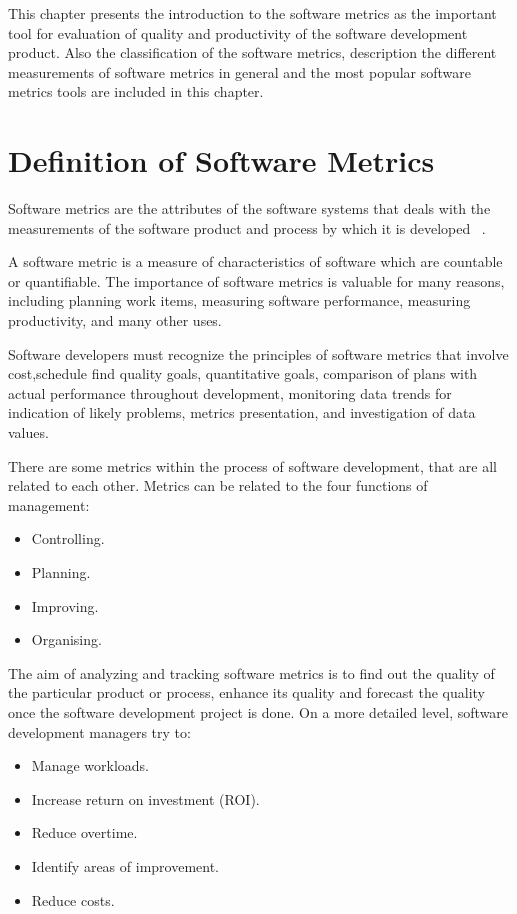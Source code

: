 This chapter presents the introduction to the software metrics as the important tool for evaluation of quality and productivity of the software development product. Also the classification of the software metrics, description the different measurements of software metrics in general and the most popular software metrics tools are included in this chapter.


\section{Definition of Software Metrics}

Software metrics are the attributes of the software systems that deals with the measurements of the software product and process by which it is developed ~\cite{metrix}.
 
A software metric is a measure of characteristics of software which are countable or quantifiable. The importance of software metrics is valuable for many reasons, including planning work items, measuring software performance, measuring productivity, and many other uses.

Software developers must recognize the principles of software metrics that involve cost,schedule find quality goals, quantitative goals, comparison of plans with actual performance throughout development, monitoring data trends for indication of likely problems, metrics presentation, and investigation of data values.

There are some metrics within the process of software development, that are all related to each other. Metrics can be related to the four functions of management:

\begin{itemize}
	\item Controlling.
	\item Planning.
	\item Improving.
	\item Organising.
\end{itemize}

The aim of analyzing and tracking software metrics is to find out the quality of the particular product or process, enhance its quality and forecast the quality once the software development project is done. On a more detailed level, software development managers try to:

\begin{itemize}
	\item Manage workloads.
	\item Increase return on investment (ROI).
	\item Reduce overtime.
	\item Identify areas of improvement.
	\item Reduce costs.
\end{itemize}

